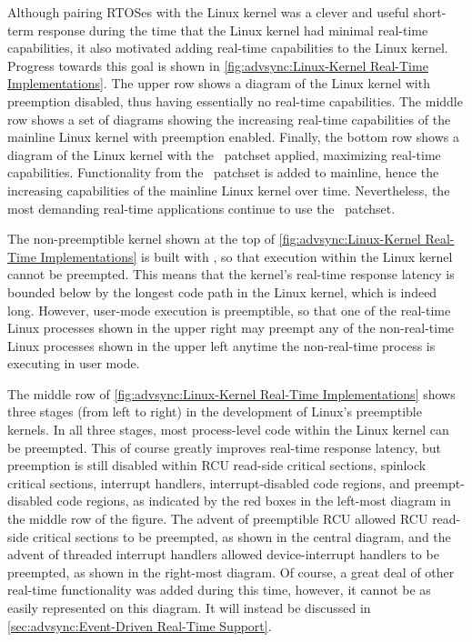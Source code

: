 Although pairing RTOSes with the Linux kernel was a clever and useful
short-term response during the time that the Linux kernel had minimal
real-time capabilities, it also motivated adding real-time capabilities
to the Linux kernel.
Progress towards this goal is shown in
\cref{fig:advsync:Linux-Kernel Real-Time Implementations}.
The upper row shows a diagram of the Linux kernel with preemption disabled,
thus having essentially no real-time capabilities.
The middle row shows a set of diagrams showing the increasing real-time
capabilities of the mainline Linux kernel with preemption enabled.
Finally, the bottom row shows a diagram of the Linux kernel with the
\rt\ patchset applied, maximizing real-time capabilities.
Functionality from the \rt\ patchset is added to mainline,
hence the increasing capabilities of the mainline Linux kernel over time.
Nevertheless, the most demanding real-time applications continue to use
the \rt\ patchset.

The non-preemptible kernel shown at the top of
\cref{fig:advsync:Linux-Kernel Real-Time Implementations}
is built with , so that execution within the Linux
kernel cannot be preempted.
This means that the kernel's real-time response latency is bounded below
by the longest code path in the Linux kernel, which is indeed long.
However, user-mode execution is preemptible, so that one of the
real-time Linux processes shown in the upper right may preempt any of the
non-real-time Linux processes shown in the upper left anytime the
non-real-time process is executing in user mode.

The middle row of
\cref{fig:advsync:Linux-Kernel Real-Time Implementations}
shows three stages (from left to right) in the development of Linux's
preemptible kernels.
In all three stages, most process-level code within the Linux kernel
can be preempted.
This of course greatly improves real-time response latency, but
preemption is still disabled
within RCU read-side critical sections,
spinlock critical sections,
interrupt handlers,
interrupt-disabled code regions, and
preempt-disabled code regions, as indicated by the red boxes in the
left-most diagram in the middle row of the figure.
The advent of preemptible RCU allowed RCU read-side critical sections
to be preempted, as shown in the central diagram,
and the advent of threaded interrupt handlers allowed device-interrupt
handlers to be preempted, as shown in the right-most diagram.
Of course, a great deal of other real-time functionality was added
during this time, however, it cannot be as easily represented on this
diagram.
It will instead be discussed in
\cref{sec:advsync:Event-Driven Real-Time Support}.

